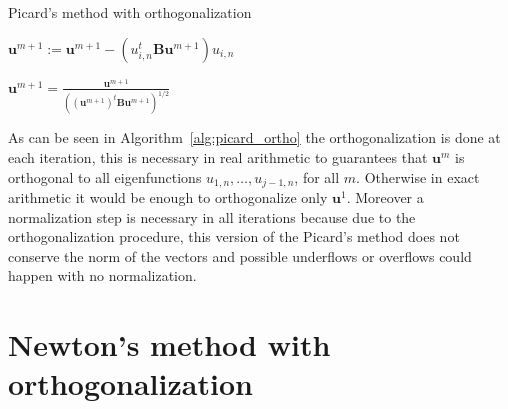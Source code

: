 \documentclass[preprint ,12pt]{elsarticle}
\begin{document}

\begin{algorithm}[H] \caption{Picard's method with orthogonalization} \label{alg:picard_ortho} 
\begin{algorithmic}

    

\REPEAT



\STATE $\mathbf{u}^{m+1}:=\mathbf{u}^{m+1}-(u_{i,n}^t\mathbf{B}\mathbf{u}^{m+1})u_{i,n}$
\ENDFOR


\STATE $\displaystyle \mathbf{u}^{m+1}=\frac{\mathbf{u}^{m+1}}{((\mathbf{u}^{m+1})^t\mathbf{B}\mathbf{u}^{m+1})^{1/2}}$
\end{algorithmic}
\end{algorithm}

As can be seen in Algorithm~\ref{alg:picard_ortho}  the orthogonalization is done at each iteration, this is necessary in real arithmetic to guarantees that $\mathbf{u}^m$ is orthogonal to all eigenfunctions $u_{1,n},\dots,u_{j-1,n}$, for all $m$. Otherwise in exact arithmetic it would be enough to orthogonalize only $\mathbf{u}^1$. Moreover a normalization step is necessary in all iterations because due to the orthogonalization procedure, this version of the Picard's method does not conserve the norm of the vectors and possible underflows or overflows could happen with no normalization.


\section{Newton's method with orthogonalization}
\end{document}
